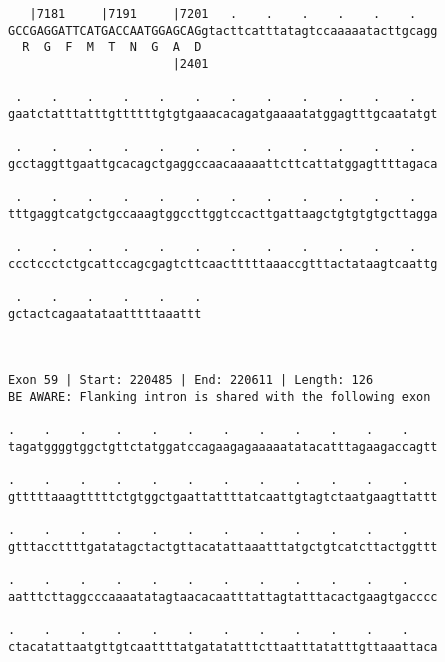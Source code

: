 \documentclass{article}
\begin{document}
\begin{Verbatim}
   |7181     |7191     |7201   .    .    .    .    .    .   
GCCGAGGATTCATGACCAATGGAGCAGgtacttcatttatagtccaaaaatacttgcagg
  R  G  F  M  T  N  G  A  D                                 
                       |2401                                
  
 .    .    .    .    .    .    .    .    .    .    .    .   
gaatctatttatttgttttttgtgtgaaacacagatgaaaatatggagtttgcaatatgt
                                                            
 .    .    .    .    .    .    .    .    .    .    .    .   
gcctaggttgaattgcacagctgaggccaacaaaaattcttcattatggagttttagaca
                                                            
 .    .    .    .    .    .    .    .    .    .    .    .   
tttgaggtcatgctgccaaagtggccttggtccacttgattaagctgtgtgtgcttagga
                                                            
 .    .    .    .    .    .    .    .    .    .    .    .   
ccctccctctgcattccagcgagtcttcaactttttaaaccgtttactataagtcaattg
                                                            
 .    .    .    .    .    .
gctactcagaatataatttttaaattt
                           
                           
 
Exon 59 | Start: 220485 | End: 220611 | Length: 126
BE AWARE: Flanking intron is shared with the following exon
 
.    .    .    .    .    .    .    .    .    .    .    .    
tagatggggtggctgttctatggatccagaagagaaaaatatacatttagaagaccagtt
                                                            
.    .    .    .    .    .    .    .    .    .    .    .    
gtttttaaagtttttctgtggctgaattattttatcaattgtagtctaatgaagttattt
                                                            
.    .    .    .    .    .    .    .    .    .    .    .    
gtttaccttttgatatagctactgttacatattaaatttatgctgtcatcttactggttt
                                                            
.    .    .    .    .    .    .    .    .    .    .    .    
aatttcttaggcccaaaatatagtaacacaatttattagtatttacactgaagtgacccc
                                                            
.    .    .    .    .    .    .    .    .    .    .    .    
ctacatattaatgttgtcaattttatgatatatttcttaatttatatttgttaaattaca
                                                            

\end{Verbatim}
\end{document}
